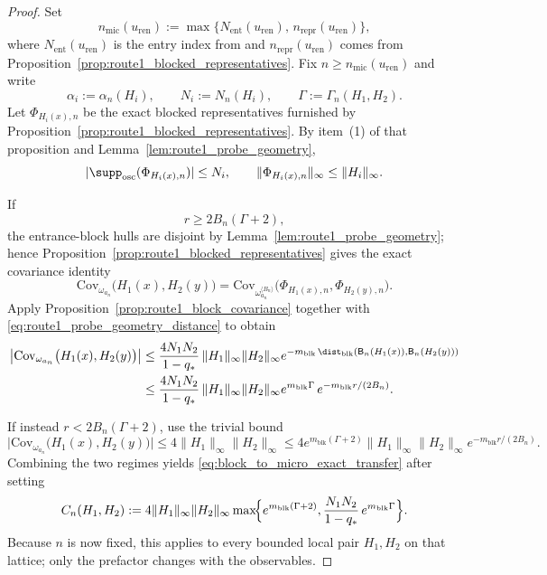 \begin{proof}
Set
\[
n_{\mathrm{mic}}(u_{\mathrm{ren}}):=
\max\bigl\{N_{\mathrm{ent}}(u_{\mathrm{ren}}),\,n_{\mathrm{repr}}(u_{\mathrm{ren}})\bigr\},
\]
where $N_{\mathrm{ent}}(u_{\mathrm{ren}})$ is the entry index from  and $n_{\mathrm{repr}}(u_{\mathrm{ren}})$ comes from Proposition~\ref{prop:route1_blocked_representatives}.
Fix $n\ge n_{\mathrm{mic}}(u_{\mathrm{ren}})$ and write
\[
\alpha_i:=\alpha_n(H_i),\qquad
N_i:=N_n(H_i),\qquad
\Gamma:=\Gamma_n(H_1,H_2).
\]
Let $\Phi_{H_i(x),n}$ be the exact blocked representatives furnished by Proposition~\ref{prop:route1_blocked_representatives}.
By item~(1) of that proposition and Lemma~\ref{lem:route1_probe_geometry},
\[
|\supp_{\mathrm{osc}}(\Phi_{H_i(x),n})|
\le N_i,
\qquad
\|\Phi_{H_i(x),n}\|_\infty\le \|H_i\|_\infty.
\]

If
\[
r\ge 2B_n(\Gamma+2),
\]
the entrance-block hulls are disjoint by Lemma~\ref{lem:route1_probe_geometry}; hence Proposition~\ref{prop:route1_blocked_representatives} gives the exact covariance identity
\[
\mathrm{Cov}_{\omega_{a_n}}\big(H_1(x),H_2(y)\big)
=
\mathrm{Cov}_{\omega_{a_n}^{\langle B_n\rangle}}\big(\Phi_{H_1(x),n},\Phi_{H_2(y),n}\big).
\]
Apply Proposition~\ref{prop:route1_block_covariance} together with \eqref{eq:route1_probe_geometry_distance} to obtain
\begin{align*}
\big|\mathrm{Cov}_{\omega_{a_n}}\big(H_1(x),H_2(y)\big)\big|
&\le
\frac{4N_1N_2}{1-q_\ast}\,
\|H_1\|_\infty\|H_2\|_\infty
e^{-m_{\mathrm{blk}}\,\dist_{\mathrm{blk}}(\mathsf B_n(H_1(x)),\mathsf B_n(H_2(y)))}\\
&\le
\frac{4N_1N_2}{1-q_\ast}\,
\|H_1\|_\infty\|H_2\|_\infty
e^{m_{\mathrm{blk}}\Gamma}\,
e^{-m_{\mathrm{blk}}r/(2B_n)}.
\end{align*}

If instead $r<2B_n(\Gamma+2)$, use the trivial bound
\[
\big|\mathrm{Cov}_{\omega_{a_n}}\big(H_1(x),H_2(y)\big)\big|
\le 4\|H_1\|_\infty\|H_2\|_\infty
\le 4e^{m_{\mathrm{blk}}(\Gamma+2)}\|H_1\|_\infty\|H_2\|_\infty e^{-m_{\mathrm{blk}}r/(2B_n)}.
\]
Combining the two regimes yields \eqref{eq:block_to_micro_exact_transfer} after setting
\[
C_n(H_1,H_2):=
4\|H_1\|_\infty\|H_2\|_\infty
\max\!\Bigl\{
e^{m_{\mathrm{blk}}(\Gamma+2)},
\frac{N_1N_2}{1-q_\ast}\,e^{m_{\mathrm{blk}}\Gamma}
\Bigr\}.
\]
Because $n$ is now fixed, this applies to every bounded local pair $H_1,H_2$ on that lattice; only the prefactor changes with the observables.
\end{proof}

